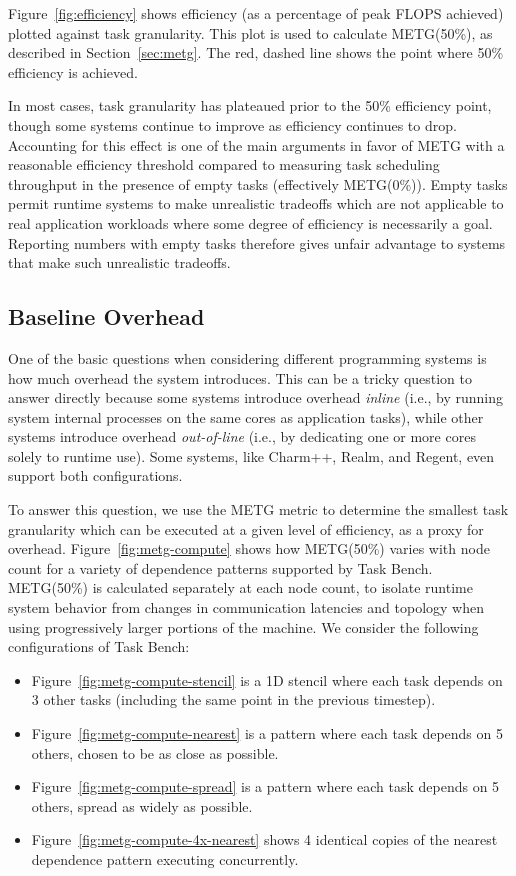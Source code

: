 Figure~\ref{fig:efficiency} shows efficiency (as a percentage of
peak FLOPS achieved) plotted against task granularity. This plot is
used to calculate METG(50\%), as described in Section~\ref{sec:metg}. The
red, dashed line shows the point where 50\% efficiency is achieved.

In most cases, task granularity has plateaued prior to the 50\% efficiency point,
though some systems continue to improve as efficiency continues
to drop. Accounting for this effect is one of the main arguments in
favor of METG with a reasonable efficiency threshold compared to
measuring task scheduling throughput in the presence of empty tasks
(effectively METG(0\%)). Empty tasks permit runtime
systems to make unrealistic tradeoffs which are not applicable to real
application workloads where some degree of efficiency is necessarily a
goal. Reporting numbers with empty tasks therefore gives unfair
advantage to systems that make such unrealistic tradeoffs.

\subsection{Baseline Overhead}

One of the basic questions when considering different programming
systems is how much overhead the system introduces. This can be a
tricky question to answer directly because some systems introduce
overhead \emph{inline} (i.e., by running system internal processes on
the same cores as application tasks), while other systems introduce
overhead \emph{out-of-line} (i.e., by dedicating one or more cores
solely to runtime use). Some systems, like Charm++, Realm, and Regent,
even support both configurations.

To answer this question, we use the METG metric to determine the
smallest task granularity which can be executed at a given level of
efficiency, as a proxy for overhead. Figure~\ref{fig:metg-compute}
shows how METG(50\%) varies with node count for a variety of
dependence patterns supported by Task Bench. METG(50\%) is calculated
separately at each node count, to isolate runtime system behavior from
changes in communication latencies and topology when using
progressively larger portions of the machine. We consider the
following configurations of Task Bench:

\begin{itemize}
\item Figure~\ref{fig:metg-compute-stencil} is a 1D stencil where each
  task depends on 3 other tasks (including the same point in the
  previous timestep).
\item Figure~\ref{fig:metg-compute-nearest} is a pattern where each
  task depends on 5 others, chosen to be as close as possible.
\item Figure~\ref{fig:metg-compute-spread} is a pattern where each
  task depends on 5 others, spread as widely as possible.
\item Figure~\ref{fig:metg-compute-4x-nearest} shows 4 identical
  copies of the nearest dependence pattern executing concurrently.
\end{itemize}

